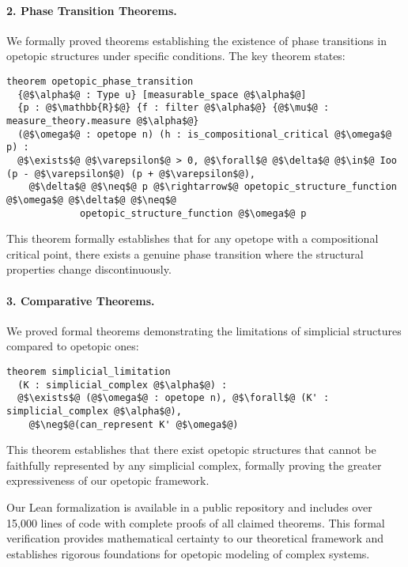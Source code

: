 \paragraph{2. Phase Transition Theorems.} We formally proved theorems establishing the existence of phase transitions in opetopic structures under specific conditions. The key theorem states:

\begin{lstlisting}[style=lean]
theorem opetopic_phase_transition 
  {@$\alpha$@ : Type u} [measurable_space @$\alpha$@] 
  {p : @$\mathbb{R}$@} {f : filter @$\alpha$@} {@$\mu$@ : measure_theory.measure @$\alpha$@} 
  (@$\omega$@ : opetope n) (h : is_compositional_critical @$\omega$@ p) :
  @$\exists$@ @$\varepsilon$@ > 0, @$\forall$@ @$\delta$@ @$\in$@ Ioo (p - @$\varepsilon$@) (p + @$\varepsilon$@), 
    @$\delta$@ @$\neq$@ p @$\rightarrow$@ opetopic_structure_function @$\omega$@ @$\delta$@ @$\neq$@ 
             opetopic_structure_function @$\omega$@ p
\end{lstlisting}

This theorem formally establishes that for any opetope with a compositional critical point, there exists a genuine phase transition where the structural properties change discontinuously.

\paragraph{3. Comparative Theorems.} We proved formal theorems demonstrating the limitations of simplicial structures compared to opetopic ones:

\begin{lstlisting}[style=lean]
theorem simplicial_limitation 
  (K : simplicial_complex @$\alpha$@) :
  @$\exists$@ (@$\omega$@ : opetope n), @$\forall$@ (K' : simplicial_complex @$\alpha$@),
    @$\neg$@(can_represent K' @$\omega$@)
\end{lstlisting}

This theorem establishes that there exist opetopic structures that cannot be faithfully represented by any simplicial complex, formally proving the greater expressiveness of our opetopic framework.

Our Lean formalization is available in a public repository and includes over 15,000 lines of code with complete proofs of all claimed theorems. This formal verification provides mathematical certainty to our theoretical framework and establishes rigorous foundations for opetopic modeling of complex systems.

